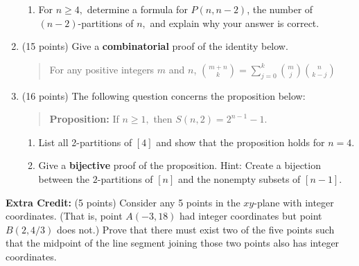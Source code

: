 \documentclass[11pt]{article}
\renewcommand{\d}{\displaystyle}
\begin{document}
\begin{enumerate}
\begin{enumerate}
	\item For $n \geq 4,$ determine a formula for $P(n,n-2)$, the number of $(n-2)$-partitions of $n,$ and explain why your answer is correct.
	\end{enumerate}
\vspace{4in}

\newpage	
\item (15 points) Give a \textbf{combinatorial} proof of the identity below.\\

\begin{quote} For any positive integers $m$ and $n$, $\d{{m+n \choose k} = \sum_{j=0}^k{m \choose j}{n \choose k-j}}$ \end{quote}
\newpage
\item (16 points) The following question concerns the proposition below: 

\begin{quote} \textbf{Proposition:} If $n \geq 1,$ then $S(n,2)=2^{n-1}-1.$ \end{quote}

	\begin{enumerate}
	\item List all 2-partitions of $[4]$ and show that the proposition holds for $n=4.$\\
	\vspace{1.5in}
	\item Give a \textbf{bijective} proof of the proposition. Hint: Create a bijection between the $2$-partitions of $[n]$ and the nonempty subsets of $[n-1].$
	\end{enumerate}
	\newpage
	
\end{enumerate}
\textbf{Extra Credit:} (5 points) Consider any 5 points in the $xy$-plane with integer coordinates. (That is, point $A(-3,18)$ had integer coordinates but point $B(2,4/3)$ does not.) Prove that there must exist two of the five points such that the midpoint of the line segment joining those two points also has integer coordinates.
\vfill
\end{document}
